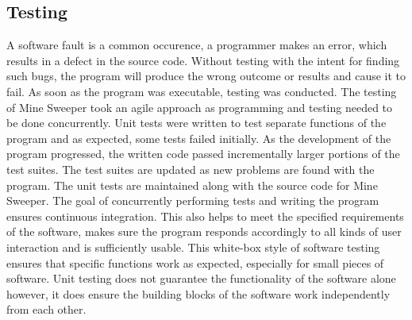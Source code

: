 \documentclass[12pt, a4]{report}
\begin{document}
	\subsection{Testing}
	\par A software fault is a common occurence, a programmer makes an error, which results in a defect in the source code. Without testing with the intent for finding such  bugs, the program will produce the wrong outcome or results and cause it to fail. As soon as the program was executable, testing was conducted. The testing of Mine Sweeper took an agile approach as programming and testing needed to be done concurrently. Unit tests were written to test separate functions of the program and as expected, some tests failed initially. As the development of the program progressed, the written code passed incrementally larger portions of the test suites. The test suites are updated as new problems are found with the program. The unit tests are maintained along with the source code for Mine Sweeper. The goal of concurrently performing tests and writing the program ensures continuous integration. This also helps to meet the specified requirements of the software, makes sure the program responds accordingly to all kinds of user interaction and is sufficiently usable. This white-box style of software testing ensures that specific functions work as expected, especially for small pieces of software. Unit testing does not guarantee the functionality of the software alone however, it does ensure the building blocks of the software work independently from each other.
	
	
	\newpage
\end{document}
